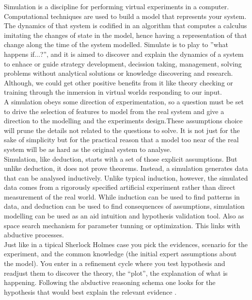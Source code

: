 \documentclass[11pt,oneside,a4paper,openright]{report}
\begin{document}
Simulation is a discipline for performing virtual experiments in a computer. Computational techniques are used to build a model that represents your system. The dynamics of that system is codified in an algorithm that computes a calculus imitating the changes of state in the model, hence having a representation of that change along the time of the system modelled. Simulate is to play to ''what happens if...?'', and it is aimed to discover and explain the dynamics of a system to enhace or guide strategy development, decission taking, management, solving problems without analytical solutions or knowledge discovering and research. Although, we could get other positive benefits from it like theory checking or training through the inmersion in virtual worlds responding to our input.\\
A simulation obeys some direction of experimentation, so a question must be set to drive the selection of features to model from the real system and give a direction to the modelling and the experiments design.These assumptions choice will prune the details not related to the questions to solve. It is not just for the sake of simplicity but for the practical reason that a model too near of the real system will be as hard as the original system to analyse.\\
Simulation, like deduction, starts with a set of those explicit assumptions. But unlike deduction, it does not prove theorems. Instead, a simulation generates data that can be analysed inductively. Unlike typical induction, however, the simulated data comes from a rigorously specified artificial experiment rather than direct measurement of the real world. While induction can be used to find patterns in data, and deduction can be used to find consequences of assumptions, simulation modelling can be used as an aid intuition and hypothesis validation tool. Also as space search mechanism for parameter tunning or optimization. This links with abductive processes.\\
Just like in a tipical Sherlock Holmes case you pick the evidences, scenario for the experiment, and the common knowledge (the initial expert assumptions about the model). You enter in a refinement cycle where you test hypothesis and readjust them to discover the theory, the ``plot'', the explanation of what is happening. Following the abductive reasoning schema one looks for the hypothesis that would best explain the relevant evidence \cite{Axelrod2003}.\\
\end{document}
